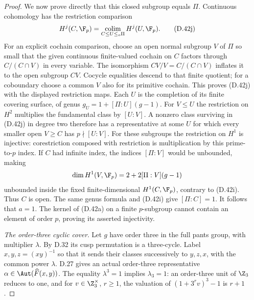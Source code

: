 \begin{proof}
We now prove directly that this closed subgroup
equals $\Pi$.
Continuous cohomology has the restriction comparison
\[
 H^j(C,\F_p)=
  \mathop{\rm colim}_{C\leq U\leq_o\Pi}H^j(U,\F_p).
                                                        \tag{D.42j}
\]
For an explicit cochain comparison, choose an
open normal subgroup $V$ of $\Pi$ so small that
the given continuous finite-valued cochain on $C$
factors through $C/(C\cap V)$ in every variable.
The isomorphism $CV/V=C/(C\cap V)$ inflates it to
the open subgroup $CV$.  Cocycle equalities descend
to that finite quotient; for a coboundary choose
a common $V$ also for its primitive cochain.
This proves (D.42j) with the displayed restriction maps.
Each $U$ is the completion of its finite covering
surface, of genus
$g_U=1+[\Pi:U](g-1)$.
For $V\leq U$ the restriction on $H^2$ multiplies
the fundamental class by $[U:V]$.
A nonzero class surviving in (D.42j) in degree two
therefore has a representative at some $U$ for
which every smaller open $V\geq C$ has
$p\nmid[U:V]$.
For these subgroups the restriction on $H^1$
is injective: corestriction composed with restriction
is multiplication by this prime-to-$p$ index.
If $C$ had infinite index, the indices
$[\Pi:V]$ would be unbounded, making
\[
 \dim H^1(V,\F_p)=2+2[\Pi:V](g-1)
\]
unbounded inside the fixed finite-dimensional
$H^1(C,\F_p)$, contrary to (D.42i).
Thus $C$ is open.  The same genus formula and
(D.42i) give $[\Pi:C]=1$.
It follows that $a=1$.
The kernel of (D.42a) on a finite $p$-subgroup
cannot contain an element of order $p$, proving
its asserted injectivity.

\emph{The order-three cyclic cover.}
Let $g$ have order three in the full pants group,
with multiplier $\lambda$.
By D.32 its cusp permutation is a three-cycle.
Label $x,y,z=(xy)^{-1}$ so that it sends their
classes successively to $y,z,x$, with the common
power $\lambda$.
D.27 gives an actual order-three representative
$\alpha\in\Aut(\widehat F(x,y))$.
The equality $\lambda^3=1$ implies $\lambda_3=1$:
an order-three unit of $\Z_3$ reduces to one,
and for $v\in\Z_3^\times$, $r\geq1$, the
valuation of $(1+3^rv)^3-1$ is $r+1$.


\end{proof}
